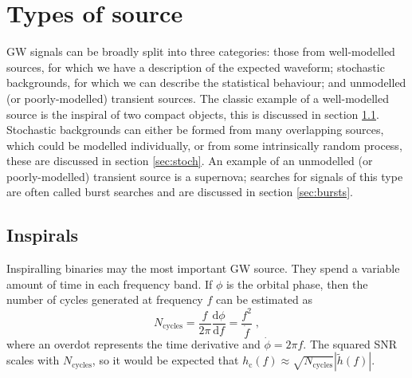 \section{Types of source}\label{sec:voc}

GW signals can be broadly split into three categories: those from well-modelled sources, for which we have a description of the expected waveform; stochastic backgrounds, for which we can describe the statistical behaviour; and unmodelled (or poorly-modelled) transient sources. The classic example of a well-modelled source is the inspiral of two compact objects, this is discussed in section \ref{sec:insp}. Stochastic backgrounds can either be formed from many overlapping sources, which could be modelled individually, or from some intrinsically random process, these are discussed in section \ref{sec:stoch}. An example of an unmodelled (or poorly-modelled) transient source is a supernova; searches for signals of this type are often called burst searches and are discussed in section \ref{sec:bursts}.

\subsection{Inspirals}\label{sec:insp}

Inspiralling binaries may the most important GW source. They spend a variable amount of time in each frequency band. If $\phi$ is the orbital phase, then the number of cycles generated at frequency $f$ can be estimated as
\begin{equation}\label{eq:inspiral}
{N}_{\mathrm{cycles}} = \frac{f}{2\pi} \frac{\mathrm{d}\phi}{\mathrm{d}f} = \frac{f^{2}}{\dot{f}} \; ,
\end{equation}
where an overdot represents the time derivative and $\dot{\phi} = 2\pi f$. The squared SNR scales with ${N}_{\mathrm{cycles}}$, so it would be expected that $h_\mathrm{c}(f)\approx \sqrt{{N}_{\mathrm{cycles}}}|\tilde{h}(f)|$.

